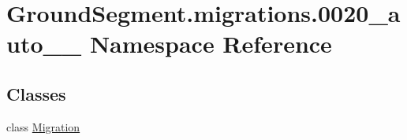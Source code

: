\hypertarget{namespace_ground_segment_1_1migrations_1_10020__auto__20161202__1040}{}\section{Ground\+Segment.\+migrations.0020\+\_\+auto\+\_\+\_ Namespace Reference}
\label{namespace_ground_segment_1_1migrations_1_10020__auto__20161202__1040}
\subsection*{Classes}
\begin{DoxyCompactItemize}
\item 
class \hyperlink{class_ground_segment_1_1migrations_1_10020__auto__20161202__1040_1_1_migration}{Migration}
\end{DoxyCompactItemize}
